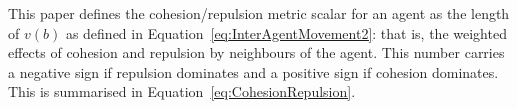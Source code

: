 \documentclass{ieeeaccess}
\begin{document}




This paper defines the cohesion/repulsion metric scalar for an agent as the
length of $v(b)$  as defined in Equation~\ref{eq:InterAgentMovement2}: that is,
the weighted effects of cohesion and repulsion by neighbours of the agent. This
number carries a negative sign if repulsion dominates and a positive sign if
cohesion dominates. This is summarised in Equation~\ref{eq:CohesionRepulsion}.
\end{document}
